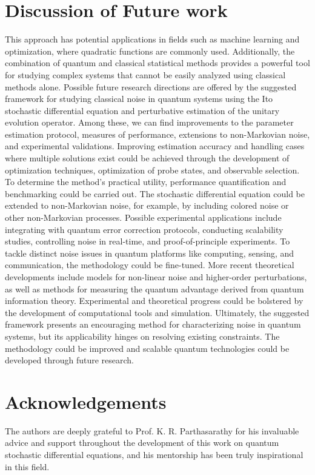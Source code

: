 \documentclass[journal,twocolumn]{IEEEtran}
\begin{document}
\section{Discussion of Future work}
This approach has potential applications in fields such as machine learning and optimization, where quadratic functions are commonly used. Additionally, the combination of quantum and classical statistical methods provides a powerful tool for studying complex systems that cannot be easily analyzed using classical methods alone. Possible future research directions are offered by the suggested framework for studying classical noise in quantum systems using the Ito stochastic differential equation and perturbative estimation of the unitary evolution operator. Among these, we can find improvements to the parameter estimation protocol, measures of performance, extensions to non-Markovian noise, and experimental validations. Improving estimation accuracy and handling cases where multiple solutions exist could be achieved through the development of optimization techniques, optimization of probe states, and observable selection. To determine the method's practical utility, performance quantification and benchmarking could be carried out. The stochastic differential equation could be extended to non-Markovian noise, for example, by including colored noise or other non-Markovian processes. Possible experimental applications include integrating with quantum error correction protocols, conducting scalability studies, controlling noise in real-time, and proof-of-principle experiments. To tackle distinct noise issues in quantum platforms like computing, sensing, and communication, the methodology could be fine-tuned. More recent theoretical developments include models for non-linear noise and higher-order perturbations, as well as methods for measuring the quantum advantage derived from quantum information theory. Experimental and theoretical progress could be bolstered by the development of computational tools and simulation. Ultimately, the suggested framework presents an encouraging method for characterizing noise in quantum systems, but its applicability hinges on resolving existing constraints. The methodology could be improved and scalable quantum technologies could be developed through future research.

\section*{Acknowledgements}
The authors are deeply grateful to Prof. K. R. Parthasarathy for his invaluable advice and support throughout the development of this work on quantum stochastic differential equations, and his mentorship has been truly inspirational in this field. 
\end{document}

